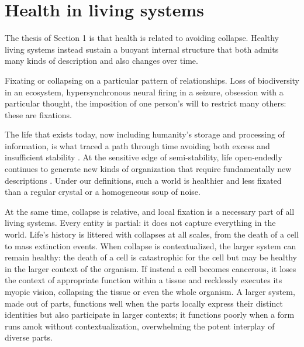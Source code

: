 \documentclass[11pt]{article}
\begin{document}
\section{Health in living systems}



The thesis of Section 1 is that health is related to avoiding collapse. Healthy living systems instead sustain a buoyant internal structure that both admits many kinds of description and also changes over time. 

Fixating or collapsing on a particular pattern of relationships.
Loss of biodiversity in an ecosystem, hypersynchronous neural firing in a seizure, obsession with a particular thought, the imposition of one person's will to restrict many others: these are fixations. 


The life that exists today, now including humanity's storage and processing of information, is what traced a path through time avoiding both excess and insufficient stability \citep{schrodinger1944what, prigogine1984order, maturana2012autopoiesis}. At the sensitive edge of semi-stability, life open-endedly continues to generate new kinds of organization that require fundamentally new descriptions \citep{kauffman1993origins, stanley2017open, canguilhem1966normal, langton1990computation}. Under our definitions, such a world is healthier and less fixated than a regular crystal or a homogeneous soup of noise.

At the same time, collapse is relative, and local fixation is a necessary part of all living systems. Every entity is partial: it does not capture everything in the world. Life's history is littered with collapses at all scales, from the death of a cell to mass extinction events. When collapse is contextualized, the larger system can remain healthy: the death of a cell is catastrophic for the cell but may be healthy in the larger context of the organism. If instead a cell becomes cancerous, it loses the context of appropriate function within a tissue and recklessly executes its myopic vision, collapsing the tissue or even the whole organism. A larger system, made out of parts, functions well when the parts locally express their distinct identities but also participate in larger contexts; it functions poorly when a form runs amok without contextualization, overwhelming the potent interplay of diverse parts.
\end{document}
